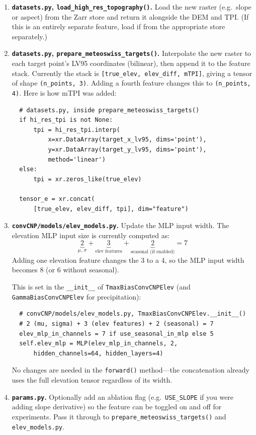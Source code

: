 \begin{enumerate}
  \item \textbf{\texttt{datasets.py}, \texttt{load\_high\_res\_topography()}.}
  Load the new raster (e.g.\ slope or aspect) from the Zarr store and return it alongside the DEM and TPI. (If this is an entirely separate feature, load if from the appropriate store separately.)

  \item \textbf{\texttt{datasets.py}, \texttt{prepare\_meteoswiss\_targets()}.}
  Interpolate the new raster to each target point's LV95 coordinates (bilinear), then append it to the feature stack.
  Currently the stack is \texttt{[true\_elev, elev\_diff, mTPI]}, giving a tensor of shape \texttt{(n\_points, 3)}.
  Adding a fourth feature changes this to \texttt{(n\_points, 4)}.
  Here is how mTPI was added:

\begin{verbatim}
  # datasets.py, inside prepare_meteoswiss_targets()
  if hi_res_tpi is not None:
      tpi = hi_res_tpi.interp(
          x=xr.DataArray(target_x_lv95, dims='point'),
          y=xr.DataArray(target_y_lv95, dims='point'),
          method='linear')
  else:
      tpi = xr.zeros_like(true_elev)

  tensor_e = xr.concat(
      [true_elev, elev_diff, tpi], dim="feature")
\end{verbatim}

  \item \textbf{\texttt{convCNP/models/elev\_models.py}.}
  Update the MLP input width.
  The elevation MLP input size is currently computed as:
  \[
    \underbrace{2}_{\mu,\,\sigma} + \underbrace{3}_{\text{elev features}} + \underbrace{2}_{\text{seasonal (if enabled)}} = 7
  \]
  Adding one elevation feature changes the 3 to a 4, so the MLP input width becomes 8 (or 6 without seasonal).

  This is set in the \texttt{\_\_init\_\_} of \texttt{TmaxBiasConvCNPElev} (and \texttt{GammaBiasConvCNPElev} for precipitation):

\begin{verbatim}
  # convCNP/models/elev_models.py, TmaxBiasConvCNPElev.__init__()
  # 2 (mu, sigma) + 3 (elev features) + 2 (seasonal) = 7
  elev_mlp_in_channels = 7 if use_seasonal_in_mlp else 5
  self.elev_mlp = MLP(elev_mlp_in_channels, 2,
      hidden_channels=64, hidden_layers=4)
\end{verbatim}

  No changes are needed in the \texttt{forward()} method---the concatenation already uses the full elevation tensor regardless of its width.

  \item \textbf{\texttt{params.py}.}
  Optionally add an ablation flag (e.g.\ \texttt{USE\_SLOPE} if you were adding slope derivative) so the feature can be toggled on and off for experiments.
  Pass it through to \newline \texttt{prepare\_meteoswiss\_targets()} and \texttt{elev\_models.py}.
\end{enumerate}

